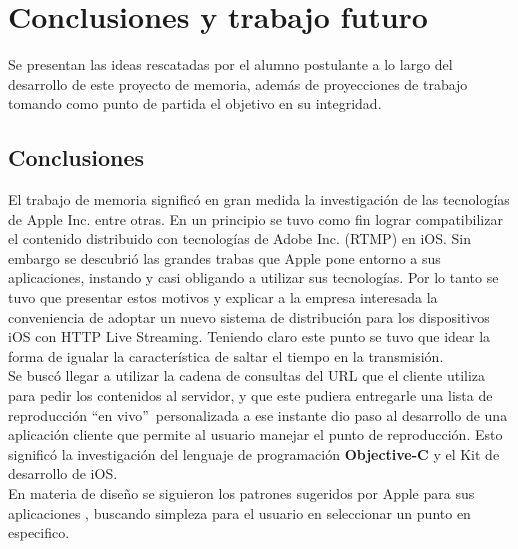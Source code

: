 
\chapter{Conclusiones y trabajo futuro}
Se presentan las ideas rescatadas por el alumno postulante a lo largo del desarrollo de este proyecto de memoria, además de proyecciones de trabajo tomando como punto de partida el objetivo en su integridad.


\section{Conclusiones}

El trabajo de memoria significó en gran medida la investigación de las tecnologías de Apple Inc. entre otras. En un principio se tuvo como fin lograr compatibilizar el contenido distribuido con tecnologías de Adobe Inc. (RTMP) en iOS. 
Sin embargo se descubrió las grandes trabas que Apple pone entorno a sus aplicaciones, instando y casi obligando a utilizar sus tecnologías. 
Por lo tanto se tuvo que presentar estos motivos y explicar a la empresa interesada la conveniencia de adoptar un nuevo sistema de distribución para los dispositivos iOS con HTTP Live Streaming. Teniendo claro este punto se tuvo que idear la forma de igualar la característica de saltar el tiempo en la transmisión. \\ 

Se buscó llegar a utilizar la cadena de consultas del URL que el cliente utiliza para pedir los contenidos al servidor, y que este pudiera entregarle una lista de reproducción \textquotedblleft en vivo\textquotedblright \ personalizada a ese instante dio paso al desarrollo de una aplicación cliente que permite al usuario manejar el punto de reproducción. Esto significó la investigación del lenguaje de programación \textbf{Objective-C} y el Kit de desarrollo de iOS.\\

En materia de diseño se siguieron los patrones sugeridos por Apple para sus aplicaciones \cite{apple-interface-user-control}, buscando simpleza para el usuario en seleccionar un punto en especifico.\\

